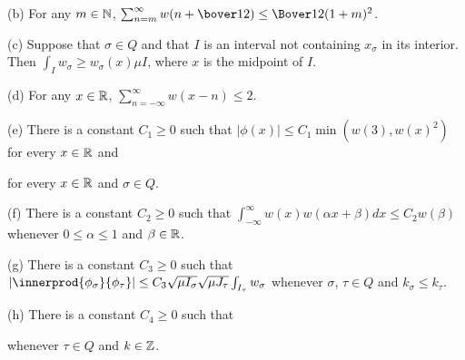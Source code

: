 (b) For any $m\in\Bbb N$,
$\sum_{n=m}^{\infty}w(n+\bover12)\le\Bover1{2(1+m)^2}$.

(c) Suppose that $\sigma\in Q$ and that $I$ is an interval not
containing $x_{\sigma}$ in its interior.   Then
$\int_Iw_{\sigma}\ge w_{\sigma}(x)\mu I$, where $x$ is the midpoint of
$I$.

(d) For any $x\in\Bbb R$,
$\sum_{n=-\infty}^{\infty}w(x-n)\le 2$.

(e) There is a constant $C_1\ge 0$ such that
$|\phi(x)|\le C_1\min(w(3),w(x)^2)$ for every $x\in\Bbb R$ and


\noindent for every $x\in\Bbb R$ and $\sigma\in Q$.

(f) There is a constant $C_2\ge 0$ such that
$\int_{-\infty}^{\infty}w(x)w(\alpha x+\beta)dx\le C_2w(\beta)$ whenever
$0\le\alpha\le 1$ and $\beta\in\Bbb R$.

(g) There is a constant $C_3\ge 0$ such that
$|\innerprod{\phi_{\sigma}}{\phi_{\tau}}|
\le C_3\sqrt{\mu I_{\sigma}}\sqrt{\mu J_{\tau}}\int_{I_{\tau}}w_{\sigma}$
whenever $\sigma$, $\tau\in Q$ and $k_{\sigma}\le k_{\tau}$.

(h) There is a constant $C_4\ge 0$ such that


\noindent whenever $\tau\in Q$ and $k\in\Bbb Z$.

